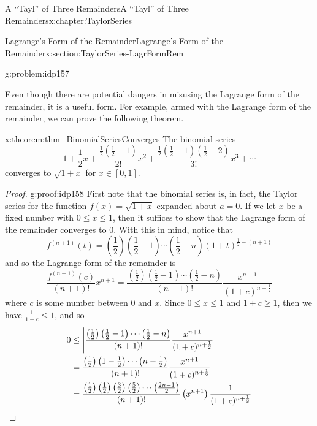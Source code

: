 \begin{chapterptx}{A ``Tayl'' of Three Remainders}{}{A ``Tayl'' of Three Remainders}{}{}{x:chapter:TaylorSeries}
\begin{sectionptx}{Lagrange's Form of the Remainder}{}{Lagrange's Form of the Remainder}{}{}{x:section:TaylorSeries-LagrFormRem}
\begin{problem}{}{g:problem:idp157}
		\end{problem}
		Even though there are potential dangers in misusing the Lagrange form of the remainder, it is a useful form.  For example, armed with the Lagrange form of the remainder, we can prove the following theorem.%
		\begin{theorem}{}{}{x:theorem:thm_BinomialSeriesConverges}%
			The binomial series%
			\begin{equation*}
				1+\frac{1}{2}x+\frac{\frac{1}{2}\left(\frac{1}{2}-1\right)}{2!}x^2+\frac{\frac{1}{2}\left(\frac{1}{2}-1\right)\left(\frac{1}{2}-2\right)}{3!}x^3+\cdots
			\end{equation*}
			converges to \(\sqrt{1+x}\) for \(x\in[0,1]\).%
		\end{theorem}
		\begin{proof}{}{g:proof:idp158}
			First note that the binomial series is, in fact, the Taylor series for the function \(f(x)=\sqrt{1+x}\) expanded about \(a=0\). If we let \(x\) be a fixed number with \(0\leq x\leq 1\), then it suffices to show that the Lagrange form of the remainder converges to \(0\). With this in mind, notice that%
			\begin{equation*}
				f^{(n+1)}(t)=\left(\frac{1}{2}\right)\left(\frac{1}{2}-1\right)\cdots\left(\frac{1}{2}-n\right)\left(1+t\right)^{\frac{1}{2}-(n+1)}
			\end{equation*}
			and so the Lagrange form of the remainder is%
			\begin{equation*}
				\frac{f^{(n+1)}(c)}{(n+1)!}x^{n+1}= \frac{\left(\frac{1}{2}\right)\left(\frac{1}{2}-1\right)\cdots \left(\frac{1}{2}-n\right)}{(n+1)!}\frac{x^{n+1}}{(1+c)^{n+\frac{1}{2}}}
			\end{equation*}
			where \(c\) is some number between \(0\) and \(x\). Since \(0\leq x\leq 1\) and \(1+c\geq 1\), then we have \(\frac{1}{1+c}\leq 1\), and so%
			\begin{align*}
				0\amp \leq \left|\frac{\left(\frac{1}{2}\right)\left(\frac{1}{2}-1\right)\cdots\left(\frac{1}{2}-n\right)}{(n+1)!}\frac{x^{n+1}}{(1+c)^{n+\frac{1}{2}}}\right|\\
				\amp =\frac{\left(\frac{1}{2}\right)\left(1-\frac{1}{2}\right)\cdots\left(n-\frac{1}{2}\right)}{(n+1)!}\frac{x^{n+1}}{(1+c)^{n+\frac{1}{2}}}\\
				\amp =\frac{\left(\frac{1}{2}\right)\left(\frac{1}{2}\right)\left(\frac{3}{2}\right)\left(\frac{5}{2}\right)\cdots\left(\frac{2n-1}{2}\right)}{(n+1)!}\left(x^{n+1}\right)\frac{1}{(1+c)^{n+\frac{1}{2}}}\\

\end{align*}
\end{proof}
\end{sectionptx}
\end{chapterptx}
